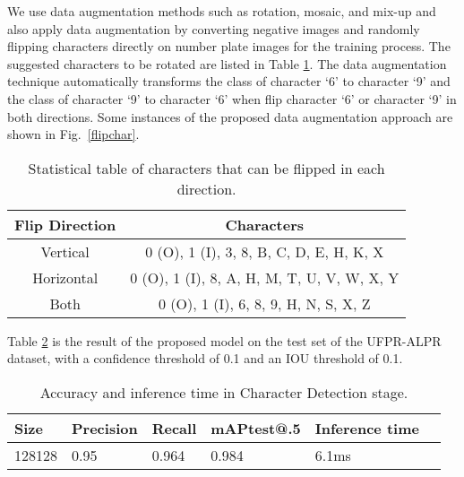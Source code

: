 \documentclass[conference]{IEEEtran}
\begin{document}
We use data augmentation methods such as rotation, mosaic, and mix-up and also apply data augmentation by converting negative images and randomly flipping characters directly on number plate images for the training process. The suggested characters to be rotated are listed in Table \ref{table3}. The data augmentation technique automatically transforms the class of character `6' to character `9' and the class of character `9' to character `6' when flip character `6' or character `9' in both directions. Some instances of the proposed data augmentation approach are shown in Fig.~\ref{flipchar}.
\begin{table}[h!]
  \begin{center}
    \centering
    \caption{Statistical table of characters that can be flipped in each direction.}
\begin{tabular}{|c | c |}
    \hline
      \textbf{Flip Direction} & \textbf{Characters} \\
      \hline
      Vertical & 0 (O), 1 (I), 3, 8, B, C, D, E, H, K, X   \\
      Horizontal &  0 (O), 1 (I), 8, A, H, M, T, U, V, W, X, Y  \\
      Both &  0 (O), 1 (I), 6, 8, 9, H, N, S, X, Z   \\
     \hline
    \end{tabular}
    \label{table3}
  \end{center}
\end{table}

Table \ref{table4} is the result of the proposed model on the test set of the UFPR-ALPR dataset, with a confidence threshold of 0.1 and an IOU threshold of 0.1.

\begin{table}[h!]
  \begin{center}
    \centering
    \caption{Accuracy and inference time in Character Detection stage.}
    \begin{tabular}{|p{11mm} | p{11mm} | p{8mm} | p{12mm} | p{12mm}| p{11mm}|}
    \hline
      \textbf{Size}  & \textbf{Precision} & \textbf{Recall}& \textbf{mAP\newline test@.5}& \textbf{Inference time}\\
      \hline
        128128  & 0.95 & 0.964 & 0.984 & 6.1ms\\
      \hline
    \end{tabular}
    \label{table4}
  \end{center}
\end{table}
\end{document}
